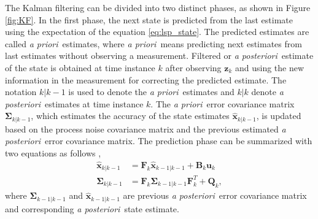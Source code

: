 \documentclass[english, 12pt, a4paper, elec, utf8, a-1b, online]{aaltothesis}
\renewcommand{\vec}[1]{\mathbf{#1}}
\newcommand{\xprior}{\hat{\vec{x}}_{k|k-1}}
\newcommand{\xlast}{\hat{\vec{x}}_{k-1|k-1}}
\newcommand{\priorecov}{\boldsymbol{\Sigma}_{k|k-1}}
\newcommand{\lastecov}{\boldsymbol{\Sigma}_{k-1|k-1}}
\newcommand{\z}{\vec{z}_k}
\newcommand{\stmodel}{\vec{F}_k}
\newcommand{\cimodel}{\vec{B}_k}
\newcommand{\cinput}{\vec{u}_k}
\newcommand{\pcov}{\vec{Q}_k}
\def\prior{\textit{a priori}\ }
\def\post{\textit{a posteriori}\ }
\begin{document}
The Kalman filtering can be divided into two distinct phases, as shown in Figure \ref{fig:KF}.
In the first phase, the next state is predicted from the last estimate using the expectation of the equation \eqref{eq:lsp_state}.
The predicted estimates are called \prior estimates, where \prior means predicting next estimates from last estimates without observing a measurement.
Filtered or \post estimate of the state is obtained at time instance $k$ after observing $\z$ and using the new information in the measurement for correcting the predicted estimate. 
The notation $k|k-1$ is used to denote the \prior estimates and $k|k$ denote \post estimates at time instance $k$.
The \prior error covariance matrix $\priorecov$, which estimates the accuracy of the state estimates $\xprior$, is updated based on the process noise covariance matrix and the previous estimated \post error covariance matrix.
The prediction phase can be summarized with two equations as follows \cite{Zarchan2000},
\begin{subequations}
\label{eq:kf_predict}
\begin{align}
    \xprior &= \stmodel \xlast + \cimodel \cinput \label{eq:kf_pred_x} \\ 
    \priorecov &= \stmodel \lastecov \stmodel^T + \pcov \label{eq:kf_prior_error_cov},
\end{align}
\end{subequations}
where $\lastecov$ and $\xlast$ are previous \post error covariance matrix and corresponding \post state estimate.
\end{document}
